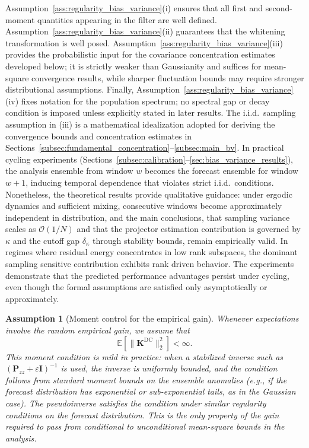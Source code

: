 \documentclass[11pt,a4paper]{article}
\newtheorem{assumption}{Assumption}
\begin{document}
\noindent
Assumption~\ref{ass:regularity_bias_variance}(i) ensures that all first and second-moment quantities appearing in the filter are well defined. Assumption~\ref{ass:regularity_bias_variance}(ii) guarantees that the whitening transformation is well posed. Assumption~\ref{ass:regularity_bias_variance}(iii) provides the probabilistic input for the covariance concentration estimates developed below; it is strictly weaker than Gaussianity and suffices for mean-square convergence results, while sharper fluctuation bounds may require stronger distributional assumptions. Finally, Assumption~\ref{ass:regularity_bias_variance}(iv) fixes notation for the population spectrum; no spectral gap or decay condition is imposed unless explicitly stated in later results.
The i.i.d.\ sampling assumption in (iii) is a mathematical idealization adopted for deriving the convergence bounds and concentration estimates in Sections~\ref{subsec:fundamental_concentration}--\ref{subsec:main_bv}. In practical cycling experiments (Sections~\ref{subsec:calibration}--\ref{sec:bias_variance_results}), the analysis ensemble from window $w$ becomes the forecast ensemble for window $w+1$, inducing temporal dependence that violates strict i.i.d.\ conditions.
Nonetheless, the theoretical results provide qualitative guidance: under ergodic dynamics and sufficient mixing, consecutive windows become approximately independent in distribution, and the main conclusions, that sampling variance scales as $\mathcal{O}(1/N)$ and that the projector estimation contribution is governed by $\kappa$ and the cutoff gap $\delta_\kappa$ through stability bounds, remain empirically valid. In regimes where residual energy concentrates in low rank subspaces, the dominant sampling sensitive contribution exhibits rank driven behavior.
The experiments demonstrate that the predicted performance advantages persist under cycling, even though the formal assumptions are satisfied only asymptotically or approximately.
\par\smallskip

\begin{assumption}[Moment control for the empirical gain]
\label{ass:gain_moment}
Whenever expectations involve the random empirical gain, we assume that
\begin{equation}
\mathbb{E}\!\left[\|\mathbf{K}^{\mathrm{DC}}\|_2^{2}\right]<\infty.
\end{equation}
This moment condition is mild in practice: when a stabilized inverse such as $(\mathbf{P}_{zz}+\varepsilon\mathbf{I})^{-1}$ is used, the inverse is uniformly bounded, and the condition follows from standard moment bounds on the ensemble anomalies (e.g., if the forecast distribution has exponential or sub-exponential tails, as in the Gaussian case). The pseudoinverse satisfies the condition under similar regularity conditions on the forecast distribution. This is the only property of the gain required to pass from conditional to unconditional mean-square bounds in the analysis.
\end{assumption}
\end{document}
